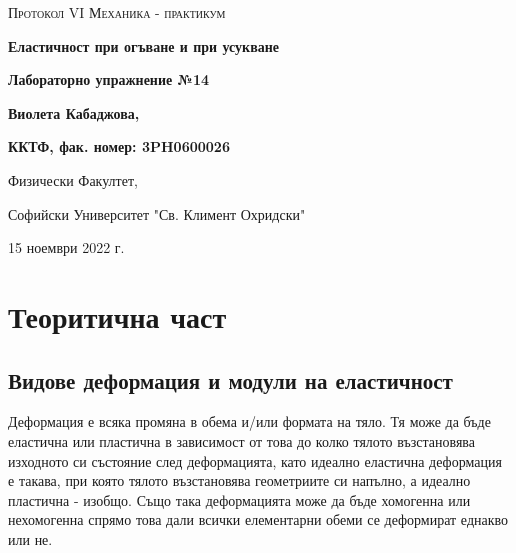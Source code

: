 \documentclass[12pt]{article}
\begin{document}
\begin{titlepage}
	\flushleft
	{\scshape\Large Протокол VI \hspace{2cm} Механика - практикум\par}
	\vspace{5cm}
	{\huge\bfseries Еластичност при огъване и при усукване\par}
	\vspace{1cm}
	{\LARGE\bfseries Лабораторно упражнение №14\par}
	\vspace{5cm}
    {\LARGE\bfseries Виолета Кабаджова, \par}
    {\large\bfseries ККТФ, фак. номер: 3PH0600026\par}
	\vspace{1cm}
	
	{\large Физически Факултет, 
	
	Софийски Университет "Св. Климент Охридски"
	
	15 ноември 2022 г.\par}
	
\end{titlepage}

\section{Теоритична част}\label{sec:theoretical-part}

\printglossary[type=\acronymtype,title={Използвани съкращения}]

\subsection{Видове деформация и модули на еластичност}
Деформация е всяка промяна в обема и/или формата на тяло. Тя може да бъде еластична или пластична в зависимост от това до колко тялото възстановява изходното си състояние след деформацията, като идеално еластична деформация е такава, при която тялото възстановява геометриите си напълно, а идеално пластична - изобщо. Също така деформацията може да бъде хомогенна или нехомогенна спрямо това дали всички елементарни обеми се деформират еднакво или не.
\end{document}
